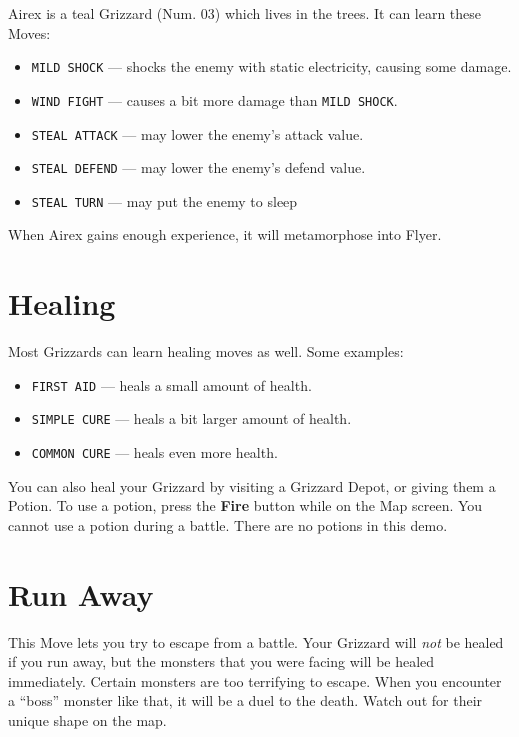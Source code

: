 \documentclass[10pt,twocolumn,openany,article]{memoir}
\begin{document}
Airex is  a teal  Grizzard (Num. 03)  which lives in  the trees.  It can
learn these Moves:

\begin{itemize}
\item \texttt{MILD SHOCK} --- shocks  the enemy with static electricity,
  causing some damage.
\item \texttt{WIND FIGHT} --- causes a bit more damage than \texttt{MILD SHOCK}.
\item \texttt{STEAL ATTACK} --- may lower the enemy's attack value.
\item \texttt{STEAL DEFEND} --- may lower the enemy's defend value.
\item \texttt{STEAL TURN} --- may put the enemy to sleep
\end{itemize}

When Airex gains enough experience, it will metamorphose into Flyer.

\fi

\pagebreak

\section{Healing}

Most Grizzards can learn healing moves as well. Some examples:

\begin{itemize}
\item \texttt{FIRST AID} --- heals a small amount of health.
\item \texttt{SIMPLE CURE} --- heals a bit larger amount of health.
\item \texttt{COMMON CURE} --- heals even more health.
\end{itemize}

You can also heal your Grizzard  by visiting a Grizzard Depot, or giving
them a Potion. To use a  potion, press the \textbf{Fire} button while on
the Map screen. You cannot use a potion during a battle. \ifdefined\DEMO
There are no potions in this demo. \fi

\section{Run Away}

This  Move lets  you try  to escape  from a  battle. Your  Grizzard will
\emph{not} be  healed if you  run away, but  the monsters that  you were
facing will be  healed immediately. Certain monsters  are too terrifying
to escape. When  you encounter a ``boss'' monster like  that, it will be
a duel to the death. Watch out for their unique shape on the map.
\end{document}
